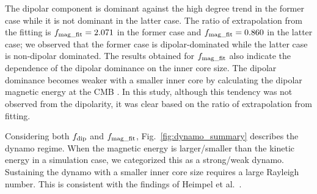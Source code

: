 The dipolar component is dominant against the high degree trend in the former case while it is not dominant in the latter case. 
The ratio of extrapolation from the fitting is $f_{\rm mag\_fit} = 2.071$ in the former case and $f_{\rm mag\_fit} = 0.860$ in the latter case; we observed that the former case is dipolar-dominated while the latter case is non-dipolar dominated. 
The results obtained for $f_{\rm mag\_fit}$  also indicate the dependence of the dipolar dominance on the inner core size. 
The dipolar dominance becomes weaker with a smaller inner core by calculating the dipolar magnetic energy at the CMB \cite{Heimpel:2005}. 
In this study, although this tendency was not observed from the dipolarity, it was clear based on the ratio of extrapolation from fitting.


Considering both $f_{\rm dip}$ and $f_{\rm mag\_fit}$, Fig.~{\color{red}\ref{fig:dynamo_summary}
} describes the dynamo regime. 
When the magnetic energy is larger/smaller than the kinetic energy in a simulation case, we categorized this as a strong/weak dynamo. 
Sustaining the dynamo with a smaller inner core size requires a large Rayleigh number. 
This is consistent with the findings of Heimpel et al.\ . 

